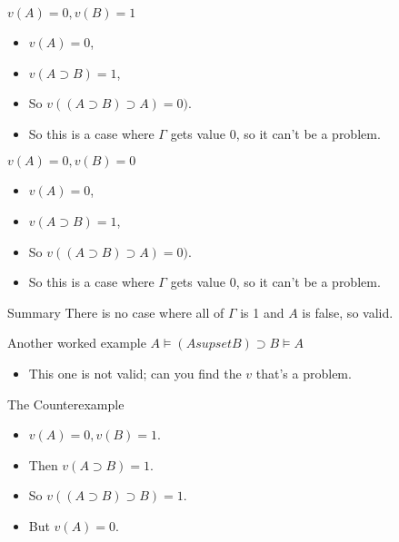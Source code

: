 \documentclass[
  17pt,
  letterpaper,
  ignorenonframetext,
  aspectratio=169,
  handout]{beamer}
\providecommand{\tightlist}{%
  \setlength{\itemsep}{0pt}\setlength{\parskip}{0pt}}\usepackage{longtable,booktabs,array}
\begin{document}
\begin{frame}{\(v(A) = 0, v(B) = 1\)}
\protect\hypertarget{va-0-vb-1}{}
\begin{itemize}[<+->]
\tightlist
\item
  \(v(A) = 0\),
\item
  \(v(A \supset B) = 1\),
\item
  So \(v((A \supset B) \supset A) = 0)\).
\item
  So this is a case where \(\Gamma\) gets value 0, so it can't be a
  problem.
\end{itemize}
\end{frame}

\begin{frame}{\(v(A) = 0, v(B) = 0\)}
\protect\hypertarget{va-0-vb-0}{}
\begin{itemize}[<+->]
\tightlist
\item
  \(v(A) = 0\),
\item
  \(v(A \supset B) = 1\),
\item
  So \(v((A \supset B) \supset A) = 0)\).
\item
  So this is a case where \(\Gamma\) gets value 0, so it can't be a
  problem.
\end{itemize}
\end{frame}

\begin{frame}{Summary}
\protect\hypertarget{summary}{}
There is no case where all of \(\Gamma\) is 1 and \(A\) is false, so
valid.
\end{frame}

\begin{frame}{Another worked example}
\protect\hypertarget{another-worked-example}{}
\(A \vDash (A supset B) \supset B \vDash A\)

\begin{itemize}[<+->]
\tightlist
\item
  This one is not valid; can you find the \(v\) that's a problem.
\end{itemize}
\end{frame}

\begin{frame}{The Counterexample}
\protect\hypertarget{the-counterexample}{}
\begin{itemize}[<+->]
\tightlist
\item
  \(v(A) = 0, v(B) = 1\).
\item
  Then \(v(A \supset B) = 1\).
\item
  So \(v((A \supset B) \supset B) = 1\).
\item
  But \(v(A) = 0\).
\end{itemize}
\end{frame}
\end{document}
